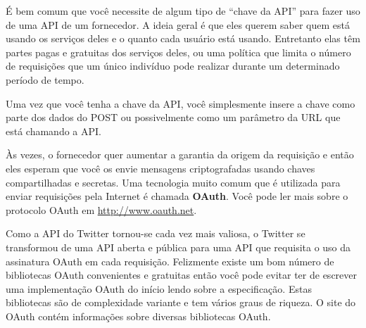 É bem comum que você necessite de algum tipo de 
``chave da API'' para fazer uso de uma API de um fornecedor.
A ideia geral é que eles querem saber quem está usando os
serviços deles e o quanto cada usuário está usando.
Entretanto elas têm partes pagas e gratuitas dos serviços
deles, ou uma política que limita o número de requisições
que um único indivíduo pode realizar durante um determinado
período de tempo.

Uma vez que você tenha a chave da API, você simplesmente
insere a chave como parte dos dados do POST ou possivelmente
como um parâmetro da URL que está chamando a API.

Às vezes, o fornecedor quer aumentar a garantia da 
origem da requisição e então eles esperam que você os
envie mensagens criptografadas usando chaves compartilhadas
e secretas. Uma tecnologia muito comum que é utilizada para 
enviar requisições pela Internet é chamada {\bf OAuth}.
Você pode ler mais sobre o protocolo OAuth em 
\url{http://www.oauth.net}.

Como a API do Twitter tornou-se cada vez mais valiosa, o
Twitter se transformou de uma API aberta e pública para uma API que
requisita o uso da assinatura OAuth em cada requisição.
Felizmente existe um bom número de bibliotecas OAuth 
convenientes e gratuitas então você pode evitar ter de escrever
uma implementação OAuth do início lendo sobre a especificação.
Estas bibliotecas são de complexidade variante e tem vários
graus de riqueza. O site do OAuth contém informações sobre
diversas bibliotecas OAuth.

